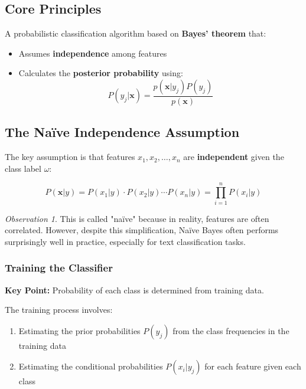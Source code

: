 \documentclass[11pt,a4paper]{article}
\theoremstyle{definition}
\theoremstyle{plain}
\theoremstyle{remark}
\newtheorem*{observation}{Observation}
\begin{document}
\subsection{Core Principles}

\begin{tcolorbox}[colback=purple!5!white,colframe=purple!75!black,title=\textbf{Naïve Bayes Classifier}]
A probabilistic classification algorithm based on \textbf{Bayes' theorem} that:
\begin{itemize}
    \item Assumes \textbf{independence} among features
    \item Calculates the \textbf{posterior probability} using:
    \[
    P(y_j|\mathbf{x}) = \frac{p(\mathbf{x}|y_j)P(y_j)}{p(\mathbf{x})}
    \]
\end{itemize}
\end{tcolorbox}

\subsection{The Naïve Independence Assumption}

The key assumption is that features $x_1, x_2, \ldots, x_n$ are \textbf{independent} given the class label $\omega$:

\begin{equation}
P(\mathbf{x} | y) = P(x_1 | y) \cdot P(x_2 | y) \cdots P(x_n | y) = \prod_{i=1}^{n} P(x_i | y)
\end{equation}

\begin{observation}
This is called "naïve" because in reality, features are often correlated. However, despite this simplification, Naïve Bayes often performs surprisingly well in practice, especially for text classification tasks.
\end{observation}

\subsubsection{Training the Classifier}

\begin{center}
\colorbox{green!15}{\parbox{0.9\textwidth}{
\textbf{Key Point:} Probability of each class is determined from training data.
}}
\end{center}

The training process involves:
\begin{enumerate}
    \item Estimating the prior probabilities $P(y_j)$ from the class frequencies in the training data
    \item Estimating the conditional probabilities $P(x_i|y_j)$ for each feature given each class
\end{enumerate}
\end{document}
